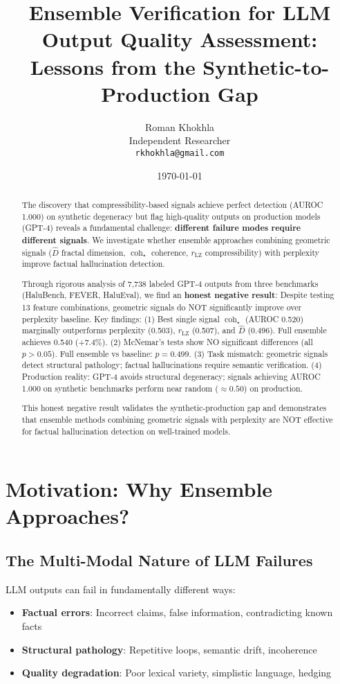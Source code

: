 \documentclass[11pt]{article}
\title{Ensemble Verification for LLM Output Quality Assessment:\\
\textbf{Lessons from the Synthetic-to-Production Gap}}
\author{
  Roman Khokhla\\
  Independent Researcher\\
  \texttt{rkhokhla@gmail.com}
}
\date{\today}
\begin{document}
\maketitle

\begin{abstract}
The discovery that compressibility-based signals achieve perfect detection (AUROC 1.000) on synthetic degeneracy but flag high-quality outputs on production models (GPT-4) reveals a fundamental challenge: \textbf{different failure modes require different signals}. We investigate whether ensemble approaches combining geometric signals ($\hat{D}$ fractal dimension, $\operatorname{coh}_\star$ coherence, $r_{\text{LZ}}$ compressibility) with perplexity improve factual hallucination detection.

Through rigorous analysis of 7,738 labeled GPT-4 outputs from three benchmarks (HaluBench, FEVER, HaluEval), we find an \textbf{honest negative result}: Despite testing 13 feature combinations, geometric signals do NOT significantly improve over perplexity baseline. Key findings: (1) Best single signal $\operatorname{coh}_\star$ (AUROC 0.520) marginally outperforms perplexity (0.503), $r_{\text{LZ}}$ (0.507), and $\hat{D}$ (0.496). Full ensemble achieves 0.540 (+7.4\%). (2) McNemar's tests show NO significant differences (all $p > 0.05$). Full ensemble vs baseline: $p=0.499$. (3) Task mismatch: geometric signals detect structural pathology; factual hallucinations require semantic verification. (4) Production reality: GPT-4 avoids structural degeneracy; signals achieving AUROC 1.000 on synthetic benchmarks perform near random ($\approx 0.50$) on production.

This honest negative result validates the synthetic-production gap and demonstrates that ensemble methods combining geometric signals with perplexity are NOT effective for factual hallucination detection on well-trained models.
\end{abstract}

\section{Motivation: Why Ensemble Approaches?}
\label{sec:motivation}

\subsection{The Multi-Modal Nature of LLM Failures}

LLM outputs can fail in fundamentally different ways:
\begin{itemize}
\item \textbf{Factual errors}: Incorrect claims, false information, contradicting known facts
\item \textbf{Structural pathology}: Repetitive loops, semantic drift, incoherence
\item \textbf{Quality degradation}: Poor lexical variety, simplistic language, hedging
\end{itemize}
\end{document}
